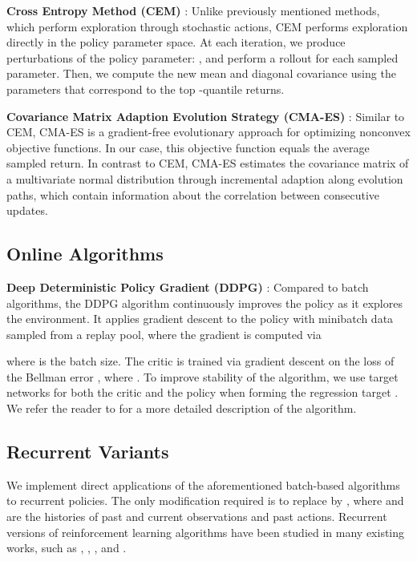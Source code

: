 \documentclass{article}
\begin{document}
{\bf Cross Entropy Method (CEM)} \cite{Rubinstein99CEM, Szita06CEM}: Unlike previously mentioned methods, which perform exploration through stochastic actions, CEM performs exploration directly in the policy parameter space. At each iteration, we produce  perturbations of the policy parameter: , and perform a rollout for each sampled parameter. Then, we compute the new mean and diagonal covariance using the parameters that correspond to the top -quantile returns.

{\bf Covariance Matrix Adaption Evolution Strategy (CMA-ES)} \cite{Hansen2001CMAES}: Similar to CEM, CMA-ES is a gradient-free evolutionary approach for optimizing nonconvex objective functions. In our case, this objective function equals the average sampled return. In contrast to CEM, CMA-ES estimates the covariance matrix of a multivariate normal distribution through incremental adaption along evolution paths, which contain information about the correlation between consecutive updates.

\subsection{Online Algorithms}

{\bf Deep Deterministic Policy Gradient (DDPG)}  \cite{Lillicrap15}: Compared to batch algorithms, the DDPG algorithm continuously improves the policy as it explores the environment. It applies gradient descent to the policy with minibatch data sampled from a replay pool, where the gradient is computed via

where  is the batch size. The critic  is trained via gradient descent on the  loss of the Bellman error , where . To improve stability of the algorithm, we use target networks for both the critic and the policy when forming the regression target . We refer the reader to \citet{Lillicrap15} for a more detailed description of the algorithm.

\subsection{Recurrent Variants}
We implement direct applications of the aforementioned batch-based algorithms to recurrent policies. The only modification required is to replace  by , where  and  are the histories of past and current observations and past actions. Recurrent versions of reinforcement learning algorithms have been studied in many existing works, such as \citet{bakker2001reinforcement}, \citet{schafer2005solving}, \citet{wierstra2007solving}, and \citet{heess2015memory}.
\end{document}
